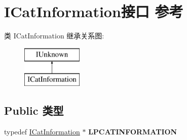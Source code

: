 \hypertarget{interface_i_cat_information}{}\section{I\+Cat\+Information接口 参考}
\label{interface_i_cat_information}
类 I\+Cat\+Information 继承关系图\+:\begin{figure}[H]
\begin{center}
\leavevmode
\includegraphics[height=2.000000cm]{interface_i_cat_information}
\end{center}
\end{figure}
\subsection*{Public 类型}
\begin{DoxyCompactItemize}
\item 
\mbox{\label{interface_i_cat_information_a638169c8006fe463f11b11d848e22ad1}} 
typedef \hyperlink{interface_i_cat_information}{I\+Cat\+Information} $\ast$ {\bfseries L\+P\+C\+A\+T\+I\+N\+F\+O\+R\+M\+A\+T\+I\+ON}
\end{DoxyCompactItemize}
